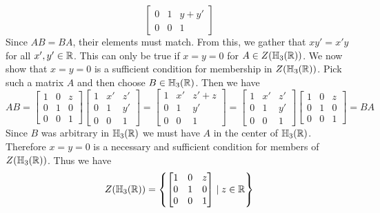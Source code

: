 \documentclass[11pt]{article}
\begin{document}
{$$\begin{bmatrix}
            0 & 1 & y+y' \\
            0 & 0 & 1
        \end{bmatrix}
        $$
        Since $AB = BA$, their elements must match.
        From this, we gather that $xy' = x'y$ for all $x', y' \in \mathbb{R}$.
        This can only be true if $x = y = 0$ for $A \in Z(\mathbb{H} _3(\mathbb{R}))$.
        We now show that $x = y = 0$ is a sufficient condition for membership in $Z ( \mathbb{H} _3 (\mathbb{R}))$.
        Pick such a matrix $A$ and then choose $B \in \mathbb{H} _3 (\mathbb{R})$.
        Then we have
        $$
        AB =
        \begin{bmatrix}
            1 & 0 & z \\
            0 & 1 & 0 \\
            0 & 0 & 1
        \end{bmatrix}
        \begin{bmatrix}
            1 & x' & z' \\
            0 & 1 & y' \\
            0 & 0 & 1
        \end{bmatrix}
        =
        \begin{bmatrix}
            1 & x' & z'+z \\
            0 & 1 & y' \\
            0 & 0 & 1
        \end{bmatrix}
        =
        \begin{bmatrix}
            1 & x' & z' \\
            0 & 1 & y' \\
            0 & 0 & 1
        \end{bmatrix}
        \begin{bmatrix}
            1 & 0 & z \\
            0 & 1 & 0 \\
            0 & 0 & 1
        \end{bmatrix}
        = BA
        $$
        Since $B$ was arbitrary in $\mathbb{H} _3 (\mathbb{R})$ we must have $A$ in the center of $\mathbb{H} _3 (\mathbb{R})$.
        Therefore $x = y = 0$ is a necessary and sufficient condition for members of $Z(\mathbb{H} _3 (\mathbb{R}))$.
        Thus we have
        $$
        Z( \mathbb{H} _3 (\mathbb{R})) = \left\{
        \begin{bmatrix}
            1 & 0 & z \\
            0 & 1 & 0 \\
            0 & 0 & 1
        \end{bmatrix}
        \mid z \in \mathbb{R} \right\}
        $$
    }
\end{document}
